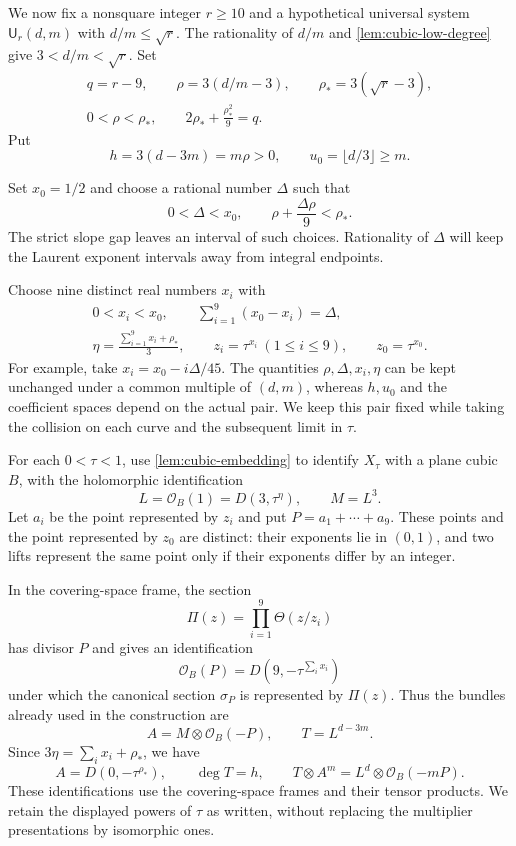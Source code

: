 We now fix a nonsquare integer $r\geq10$ and a hypothetical universal system $\mathsf U_r(d,m)$ with $d/m\leq\sqrt r$. The rationality of $d/m$ and \cref{lem:cubic-low-degree} give $3<d/m<\sqrt r$. Set
\begin{equation}
\begin{gathered}
 q=r-9,\qquad
 \rho=3(d/m-3),\qquad \rho_*=3(\sqrt r-3),\\
 0<\rho<\rho_*,\qquad
 2\rho_*+\frac{\rho_*^2}{9}=q.
\end{gathered}
\label{eq:rho}
\end{equation}
Put
\[
 h=3(d-3m)=m\rho>0,\qquad u_0=\lfloor d/3\rfloor\geq m.
\]

Set $x_0=1/2$ and choose a rational number $\Delta$ such that
\begin{equation}
 0<\Delta<x_0,\qquad
 \rho+\frac{\Delta\rho}{9}<\rho_*.
\label{eq:delta}
\end{equation}
The strict slope gap leaves an interval of such choices. Rationality of $\Delta$ will keep the Laurent exponent intervals away from integral endpoints.

Choose nine distinct real numbers $x_i$ with
\begin{equation}
\begin{gathered}
 0<x_i<x_0,\qquad \sum_{i=1}^{9}(x_0-x_i)=\Delta,\\
 \eta=\frac{\sum_{i=1}^{9}x_i+\rho_*}{3},\qquad
 z_i=\tau^{x_i}\ (1\leq i\leq9),\qquad z_0=\tau^{x_0}.
\end{gathered}
\label{eq:marked-parameters}
\end{equation}
For example, take $x_i=x_0-i\Delta/45$. The quantities $\rho,\Delta,x_i,\eta$ can be kept unchanged under a common multiple of $(d,m)$, whereas $h,u_0$ and the coefficient spaces depend on the actual pair. We keep this pair fixed while taking the collision on each curve and the subsequent limit in $\tau$.

For each $0<\tau<1$, use \cref{lem:cubic-embedding} to identify $X_\tau$ with a plane cubic $B$, with the holomorphic identification
\[
 L=\mathcal{O}_B(1)=D(3,\tau^\eta),\qquad M=L^3.
\]
Let $a_i$ be the point represented by $z_i$ and put $P=a_1+\cdots+a_9$. These points and the point represented by $z_0$ are distinct: their exponents lie in $(0,1)$, and two lifts represent the same point only if their exponents differ by an integer.

In the covering-space frame, the section
\[
 \Pi(z)=\prod_{i=1}^{9}\Theta(z/z_i)
\]
has divisor $P$ and gives an identification
\[
 \mathcal{O}_B(P)=D\left(9,-\tau^{\sum_i x_i}\right)
\]
under which the canonical section $\sigma_P$ is represented by $\Pi(z)$. Thus the bundles already used in the construction are
\[
 A=M\otimes\mathcal{O}_B(-P),\qquad T=L^{d-3m}.
\]
Since $3\eta=\sum_i x_i+\rho_*$, we have
\[
 A=D(0,-\tau^{\rho_*}),\qquad
 \deg T=h,\qquad
 T\otimes A^m=L^d\otimes\mathcal{O}_B(-mP).
\]
These identifications use the covering-space frames and their tensor products. We retain the displayed powers of $\tau$ as written, without replacing the multiplier presentations by isomorphic ones.

